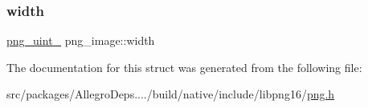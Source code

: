\subsubsection{\texorpdfstring{width}{width}}
{\footnotesize\ttfamily \hyperlink{libpng16_2pngconf_8h_aed373ad2e16fd6df7ccfa96329441d0d}{png\+\_\+uint\+\_} png\+\_\+image\+::width}



The documentation for this struct was generated from the following file\+:\begin{DoxyCompactItemize}
\item 
src/packages/\+Allegro\+Deps..../build/native/include/libpng16/\hyperlink{libpng16_2png_8h}{png.\+h}\end{DoxyCompactItemize}
